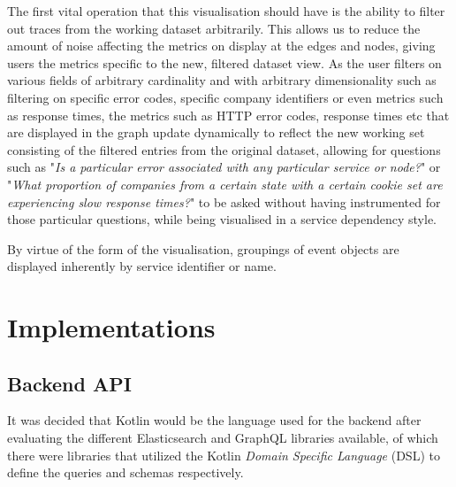 \documentclass[12pt,pdftex,titlepage]{report}
\begin{document}
                The first vital operation that this visualisation should have is the ability to filter out traces from the working dataset arbitrarily. This allows us to reduce the amount of noise affecting the metrics
                on display at the edges and nodes, giving users the metrics specific to the new, filtered dataset view. As the user filters on various fields of arbitrary cardinality and with arbitrary dimensionality such 
                as filtering on specific error codes, specific company identifiers or even metrics such as response times, the metrics such as HTTP error codes, response times etc that are displayed in the graph update 
                dynamically to reflect the new working set consisting of the filtered entries from the original dataset, allowing for questions such as "\textit{Is a particular error associated with any particular service or node?}" 
                or "\textit{What proportion of companies from a certain state with a certain cookie set are experiencing slow response times?}" to be asked without having instrumented for those particular questions, while being 
                visualised in a service dependency style.

                By virtue of the form of the visualisation, groupings of event objects are displayed inherently by service identifier or name. %



        \newpage          
        \section{Implementations}    
            \subsection{Backend API}
                It was decided that Kotlin would be the language used for the backend after evaluating the different Elasticsearch and GraphQL libraries available, of which there were libraries 
                that utilized the Kotlin \textit{Domain Specific Language} (DSL) to define the queries and schemas respectively.
\end{document}
